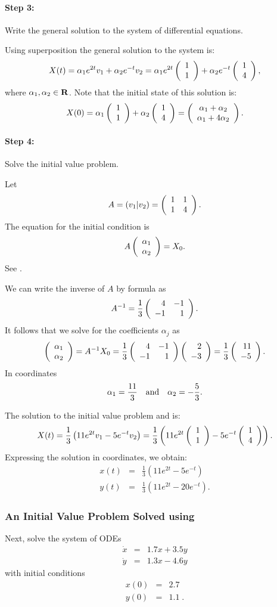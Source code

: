 \paragraph{Step 3:}  Write the general solution to the 
system of differential equations.

Using superposition the general solution to the system  is:
\[
X(t) = \alpha_1e^{2t}v_1 + \alpha_2e^{-t}v_2 = \alpha_1e^{2t}\left(\begin{array}{r} 1 \\ 1\end{array}\right)
+ \alpha_2e^{-t}\left(\begin{array}{r} 1 \\ 4\end{array}\right),
\]
where $\alpha_1,\alpha_2\in\mbox{$\bf{R}$}$.  Note that the initial state of this solution
is:
\[
X(0) =  \alpha_1\left(\begin{array}{r} 1 \\ 1\end{array}\right)+\alpha_2\left(\begin{array}{r} 1 \\ 4\end{array}\right)
= \left(\begin{array}{c} \alpha_1 + \alpha_2 \\ \alpha_1+4\alpha_2\end{array}\right).
\]

\paragraph{Step 4:}  Solve the initial value problem.

Let
\[
A=(v_1|v_2) = \left(\begin{array}{rr} 1 & 1\\ 1 &4\end{array}\right).
\]
The equation for the initial condition is
\[
A\left(\begin{array}{r} \alpha_1 \\ \alpha_2\end{array}\right) = X_0.
\]
See .

We can write the inverse of $A$ by formula as
\[
A^{-1} = \frac{1}{3}\left(\begin{array}{rr} 4 & -1\\ -1 &1\end{array}\right).
\]
It follows that we solve for the coefficients $\alpha_j$ as
\[
\left(\begin{array}{r} \alpha_1 \\ \alpha_2\end{array}\right) = A^{-1} X_0 =
\frac{1}{3}\left(\begin{array}{rr} 4 & -1\\ -1 &1\end{array}\right) \left(\begin{array}{r} 2 \\ -3\end{array}\right) =
\frac{1}{3} \left(\begin{array}{r} 11 \\ -5\end{array}\right).
\]
In coordinates
\[
\alpha_1 = \frac{11}{3} \quad\mbox{and}\quad \alpha_2=-\frac{5}{3}.
\]

The solution to the initial value problem  and  is:
\[
X(t) =  \frac{1}{3} \left(11e^{2t}v_1 - 5e^{-t}v_2\right)
= \frac{1}{3} \left(11e^{2t}\left(\begin{array}{r} 1 \\ 1\end{array}\right) - 5e^{-t}\left(\begin{array}{r} 1 \\ 4\end{array}\right) \right).
\]
Expressing the solution in coordinates, we obtain:
\begin{eqnarray*}
x(t) & = & \frac{1}{3} \left(11e^{2t} - 5e^{-t} \right)\\
y(t) & = & \frac{1}{3} \left(11e^{2t} -20e^{-t}\right).
\end{eqnarray*}



\subsubsection*{An Initial Value Problem Solved using \Matlab}

Next, solve the system of ODEs
\begin{eqnarray*}
\dot{x} & = & 1.7x+3.5y \\
\dot{y} & = & 1.3x-4.6y
\end{eqnarray*}
with initial conditions
\begin{eqnarray*}
 x(0) & = & 2.7 \\
 y(0) & = & 1.1\;.
\end{eqnarray*}

